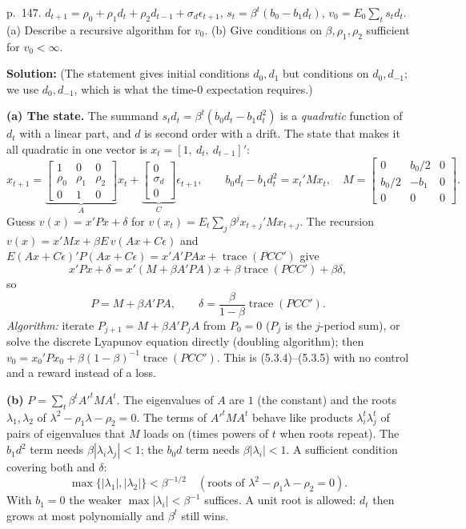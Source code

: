 \documentclass[12pt, letterpaper]{article}
\newcommand{\tr}{\operatorname{trace}}
\begin{document}
\begin{tcolorbox}[evenbox,title={Exercise 5.6 \quad Finding the state is an art}]
\begin{tcolorbox}[questionbox]
p.~147. $d_{t+1}=\rho_0+\rho_1d_t+\rho_2d_{t-1}+\sigma_d\epsilon_{t+1}$,
$s_t=\beta^t(b_0-b_1d_t)$, $v_0=E_0\sum_ts_td_t$. (a) Describe a recursive algorithm for $v_0$.
(b) Give conditions on $\beta,\rho_1,\rho_2$ sufficient for $v_0<\infty$.
\end{tcolorbox}

\textbf{Solution:} (The statement gives initial conditions $d_0,d_1$ but conditions on
$d_0,d_{-1}$; we use $d_0,d_{-1}$, which is what the time-0 expectation requires.)

\textbf{(a) The state.} The summand $s_td_t=\beta^t(b_0d_t-b_1d_t^2)$ is a \emph{quadratic}
function of $d_t$ with a linear part, and $d$ is second order with a drift. The state that makes it
all quadratic in one vector is $x_t=[1,\ d_t,\ d_{t-1}]'$:
\[
x_{t+1}=\underbrace{\begin{bmatrix}1&0&0\\\rho_0&\rho_1&\rho_2\\0&1&0\end{bmatrix}}_{A}x_t+
\underbrace{\begin{bmatrix}0\\\sigma_d\\0\end{bmatrix}}_{C}\epsilon_{t+1},\qquad
b_0d_t-b_1d_t^2=x_t'Mx_t,\quad
M=\begin{bmatrix}0&b_0/2&0\\b_0/2&-b_1&0\\0&0&0\end{bmatrix}.
\]
Guess $v(x)=x'Px+\delta$ for $v(x_t)=E_t\sum_j\beta^jx_{t+j}'Mx_{t+j}$. The recursion
$v(x)=x'Mx+\beta E\,v(Ax+C\epsilon)$ and $E(Ax+C\epsilon)'P(Ax+C\epsilon)=x'A'PAx+\tr(PCC')$ give
\[
x'Px+\delta=x'(M+\beta A'PA)x+\beta\tr(PCC')+\beta\delta,
\]
so
\[
P=M+\beta A'PA,\qquad \delta=\frac{\beta}{1-\beta}\tr(PCC').
\]
\emph{Algorithm:} iterate $P_{j+1}=M+\beta A'P_jA$ from $P_0=0$ ($P_j$ is the $j$-period sum),
or solve the discrete Lyapunov equation directly (doubling algorithm); then
$v_0=x_0'Px_0+\beta(1-\beta)^{-1}\tr(PCC')$. This is (5.3.4)--(5.3.5) with no control and a
reward instead of a loss.

\textbf{(b)} $P=\sum_t\beta^tA'^tMA^t$. The eigenvalues of $A$ are $1$ (the constant) and the roots
$\lambda_1,\lambda_2$ of $\lambda^2-\rho_1\lambda-\rho_2=0$. The terms of $A'^tMA^t$ behave like
products $\lambda_i^t\lambda_j^t$ of pairs of eigenvalues that $M$ loads on (times powers of $t$ when
roots repeat). The $b_1d^2$ term needs $\beta|\lambda_i\lambda_j|<1$; the $b_0d$ term needs
$\beta|\lambda_i|<1$. A sufficient condition covering both and $\delta$:
\[
\boxed{\max\{|\lambda_1|,|\lambda_2|\}<\beta^{-1/2}\quad(\text{roots of }\lambda^2-\rho_1\lambda-\rho_2=0).}
\]
With $b_1=0$ the weaker $\max|\lambda_i|<\beta^{-1}$ suffices. A unit root is allowed: $d_t$ then
grows at most polynomially and $\beta^t$ still wins.


\end{tcolorbox}
\end{document}
